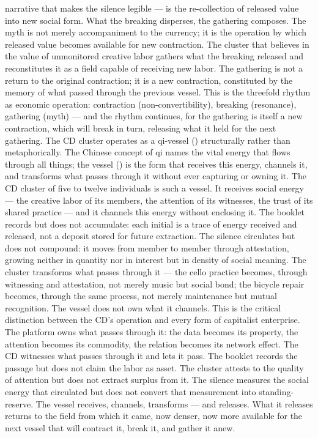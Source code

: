 narrative that makes the silence legible — is the re-collection of released value into new social form. What the breaking disperses, the gathering composes. The myth is not merely accompaniment to the currency; it is the operation by which released value becomes available for new contraction. The cluster that believes in the value of unmonitored creative labor gathers what the breaking released and reconstitutes it as a field capable of receiving new labor. The gathering is not a return to the original contraction; it is a new contraction, constituted by the memory of what passed through the previous vessel. This is the threefold rhythm as economic operation: contraction (non-convertibility), breaking (resonance), gathering (myth) — and the rhythm continues, for the gathering is itself a new contraction, which will break in turn, releasing what it held for the next gathering. The CD cluster operates as a qi-vessel () structurally rather than metaphorically. The Chinese concept of qi names the vital energy that flows through all things; the vessel () is the form that receives this energy, channels it, and transforms what passes through it without ever capturing or owning it. The CD cluster of five to twelve individuals is such a vessel. It receives social energy — the creative labor of its members, the attention of its witnesses, the trust of its shared practice — and it channels this energy without enclosing it. The booklet records but does not accumulate: each initial is a trace of energy received and released, not a deposit stored for future extraction. The silence circulates but does not compound: it moves from member to member through attestation, growing neither in quantity nor in interest but in density of social meaning. The cluster transforms what passes through it — the cello practice becomes, through witnessing and attestation, not merely music but social bond; the bicycle repair becomes, through the same process, not merely maintenance but mutual recognition. The vessel does not own what it channels. This is the critical distinction between the CD’s operation and every form of capitalist enterprise. The platform owns what passes through it: the data becomes its property, the attention becomes its commodity, the relation becomes its network effect. The CD witnesses what passes through it and lets it pass. The booklet records the passage but does not claim the labor as asset. The cluster attests to the quality of attention but does not extract surplus from it. The silence measures the social energy that circulated but does not convert that measurement into standing-reserve. The vessel receives, channels, transforms — and releases. What it releases returns to the field from which it came, now denser, now more available for the next vessel that will contract it, break it, and gather it anew.

